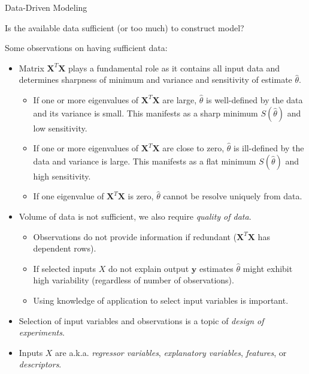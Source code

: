 \documentclass[9pt]{beamer}
\begin{document}
%
\begin{frame}{Data-Driven Modeling}

\begin{block}{}
Is the available data sufficient (or too much) to construct model?
\end{block}
Some observations on having sufficient data:
\begin{itemize}
\setlength{\itemsep}{5pt}
\item Matrix $\mathbf{X}^T\mathbf{X}$ plays a fundamental role as it contains all input data and determines  sharpness of minimum and variance and sensitivity of estimate $\hat{\theta}$. 

\begin{itemize}
\setlength{\itemsep}{5pt}
\item If one or more eigenvalues of $\mathbf{X}^T\mathbf{X}$ are large, $\hat{\theta}$ is well-defined by the data and its variance is small.  This manifests as a sharp minimum $S(\hat{\theta})$ and low sensitivity.
\item If one or more eigenvalues of $\mathbf{X}^T\mathbf{X}$ are close to zero, $\hat{\theta}$ is ill-defined by the data and variance is large. This manifests as a flat minimum $S(\hat{\theta})$ and high sensitivity.
\item If one eigenvalue of $\mathbf{X}^T\mathbf{X}$ is zero, $\hat{\theta}$ cannot be resolve uniquely from data.  
\end{itemize}
\item Volume of data is not sufficient, we also require {\em quality of data}. 

\begin{itemize}
\setlength{\itemsep}{5pt}
\item Observations do not provide information if redundant ($\mathbf{X}^T\mathbf{X}$ has dependent rows). 
\item If selected inputs $X$ do not explain output $\mathbf{y}$ estimates $\hat{\theta}$ might exhibit high variability (regardless of number of observations). 
\item Using knowledge of application to select input variables is important.  
\end{itemize}
\item Selection of input variables and observations is a topic of {\em design of experiments}. 
\item Inputs $X$ are a.k.a. {\em regressor variables}, {\em explanatory variables}, {\em features}, or {\em descriptors}. 
\end{itemize}

\end{frame}
\end{document}

